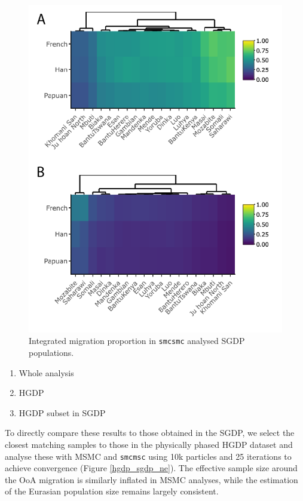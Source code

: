 \documentclass{article}
\begin{document}
\begin{figure}
	\centering
	\label{sgdp_heatmap}
	\includegraphics[width=\textwidth]{../plot/sgdp_heatmap.png}
	\caption{Integrated migration proportion in {\tt smcsmc} analysed SGDP populations.}
\end{figure}


\begin{enumerate}
    \item Whole analysis
    \item HGDP 
    \item HGDP subset in SGDP
\end{enumerate}

To directly compare these results to those obtained in the SGDP, we select the closest matching samples to those in the physically phased HGDP dataset and analyse these with MSMC and {\tt smcmsc} using 10k particles and 25 iterations to achieve convergence (Figure \ref{hgdp_sgdp_ne}). The effective sample size around the OoA migration is similarly inflated in MSMC analyses, while the estimation of the Eurasian population size remains largely consistent.  
\end{document}
